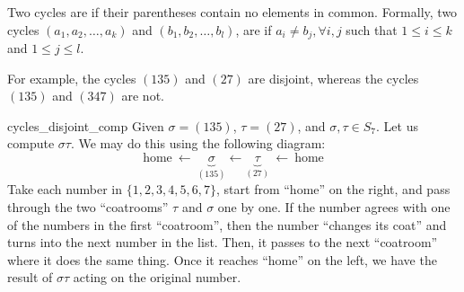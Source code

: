 
\begin{defn} \label{disjoint_cycles} 
Two cycles are  if their parentheses contain no elements in common.  Formally,
two cycles $(a_1, a_2, \ldots, a_k )$ and $(b_1, b_2, \ldots, b_l )$, are 
if $a_i \neq b_j, \forall i, j $ such that $1 \le i \le k$ and $1 \le j \le l$. 
\end{defn}

\noindent
For example, the  cycles $(135)$ and $(27 )$ are disjoint, whereas the cycles
$(135)$ and $(347 )$ are not.  

\begin{example}{cycles_disjoint_comp}
Given $\sigma = (135)$, $\tau = (27)$, and $\sigma , \tau \in S_7$. Let us compute $\sigma \tau$. 
We may  do this using the following diagram:
\[ \text{home}~\leftarrow~\underbrace{\sigma}_{(1 3 5)} \leftarrow \underbrace{\tau}_{(27)} ~\leftarrow~\text{home} \]
Take each number in $\{1,2,3,4,5,6,7\}$, start from ``home'' on the right, and pass through the two ``coatrooms''  
$\tau$ and $\sigma$ one by one.  If the number agrees with one of the numbers in the first ``coatroom'', then the number ``changes its coat'' and turns into the next number in the list.  Then, it passes to the next ``coatroom'' where it does the same thing. Once it reaches ``home'' on the left, we have the result of $\sigma \tau$ acting on the original number.
%
%
%
%
%


\end{example}
